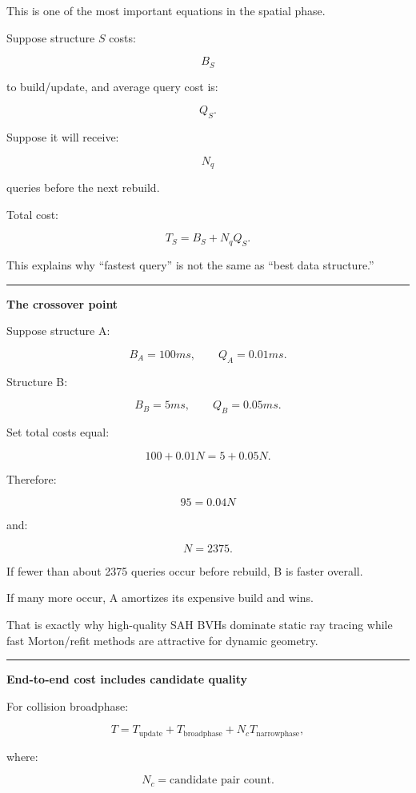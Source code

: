 This is one of the most important equations in the spatial phase.

Suppose structure \(S\) costs:

\[
B_S
\]

to build/update, and average query cost is:

\[
Q_S.
\]

Suppose it will receive:

\[
N_q
\]

queries before the next rebuild.

Total cost:

\[
\boxed{
T_S
=
B_S+N_qQ_S.
}
\]

This explains why ``fastest query'' is not the same as ``best data structure.''

\begin{center}\rule{0.5\linewidth}{0.5pt}\end{center}

\textbf{The crossover point}

Suppose structure A:

\[
B_A=100ms,
\qquad
Q_A=0.01ms.
\]

Structure B:

\[
B_B=5ms,
\qquad
Q_B=0.05ms.
\]

Set total costs equal:

\[
100+0.01N
=
5+0.05N.
\]

Therefore:

\[
95=0.04N
\]

and:

\[
\boxed{
N=2375.
}
\]

If fewer than about 2375 queries occur before rebuild, B is faster overall.

If many more occur, A amortizes its expensive build and wins.

That is exactly why high-quality SAH BVHs dominate static ray tracing while fast Morton/refit methods are attractive for dynamic geometry.

\begin{center}\rule{0.5\linewidth}{0.5pt}\end{center}

\textbf{End-to-end cost includes candidate quality}

For collision broadphase:

\[
T
=
T_{\text{update}}
+
T_{\text{broadphase}}
+
N_cT_{\text{narrowphase}},
\]

where:

\[
N_c
=
\text{candidate pair count}.
\]

